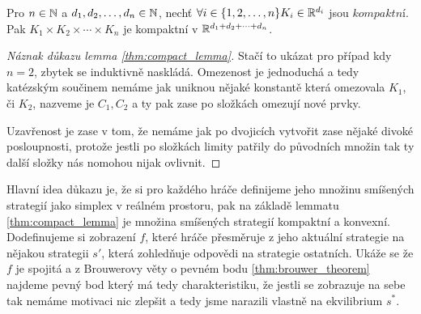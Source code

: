 \begin{theorem}
\label{thm:compact_lemma}
Pro $n \in \mathbb{N}$ a $d_1,d_2,\dots,d_n \in \mathbb{N}$, nechť $\forall i \in \{1,2,\dots,n\} K_i \in \mathbb{R}^{d_i}$ jsou $kompaktní$. 
Pak $K_1 \times K_2 \times \cdots \times K_n$ je kompaktní v $\mathbb{R}^{d_1 + d_2 + \dots + d_n}$. 
\end{theorem}
\begin{proof}[Náznak důkazu lemma \ref{thm:compact_lemma}]
Stačí to ukázat pro případ kdy $n =2$, zbytek se induktivně naskládá. 
Omezenost je jednoduchá a tedy katézským součinem nemáme jak uniknou nějaké konstantě která omezovala $K_1$, či $K_2$, nazveme je $C_1, C_2$ a ty pak zase po složkách omezují nové prvky. 

Uzavřenost je zase v tom, že nemáme jak po dvojicích vytvořit zase nějaké divoké posloupnosti, protože jestli po složkách limity patřily do původních množin tak ty další složky nás nomohou nijak ovlivnit. 
\end{proof}
Hlavní idea důkazu je, že si pro každého hráče definijeme jeho množinu smíšených strategií jako simplex v reálném prostoru, pak na základě lemmatu \ref{thm:compact_lemma} je množina smíšených strategií kompaktní a konvexní. 
Dodefinujeme si zobrazení $f$, které hráče přesměruje z jeho aktuální strategie na nějakou strategii $s'$, která zohledňuje odpovědi na strategie ostatních. 
Ukáže se že $f$ je spojitá a z Brouwerovy věty o pevném bodu \ref{thm:brouwer_theorem} najdeme pevný bod který má tedy charakteristiku, že jestli se zobrazuje na sebe tak nemáme motivaci nic zlepšit a tedy jsme narazili vlastně na ekvilibrium $s^*$. 
